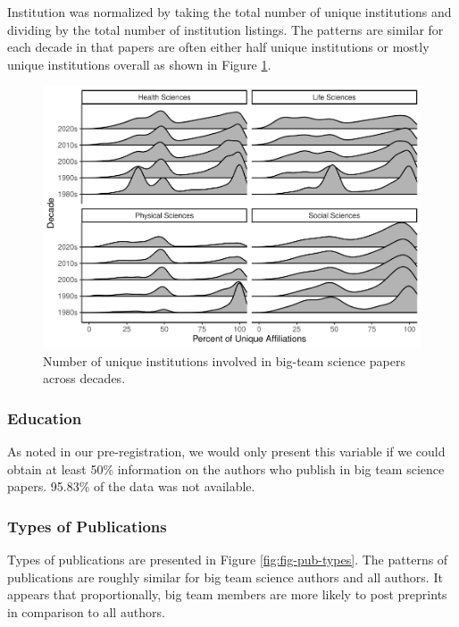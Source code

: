 \documentclass[
  man,mask,floatsintext]{apa7}
\begin{document}
Institution was normalized by taking the total number of unique institutions and dividing by the total number of institution listings. The patterns are similar for each decade in that papers are often either half unique institutions or mostly unique institutions overall as shown in Figure \ref{fig:fig-inst}.

\begin{figure}
\centering
\includegraphics{manuscript_scopus_files/figure-latex/fig-inst-1.pdf}
\caption{\label{fig:fig-inst}Number of unique institutions involved in big-team science papers across decades.}
\end{figure}

\hypertarget{education-1}{%
\subsubsection{Education}\label{education-1}}

As noted in our pre-registration, we would only present this variable if we could obtain at least 50\% information on the authors who publish in big team science papers. 95.83\% of the data was not available.

\hypertarget{types-of-publications-1}{%
\subsubsection{Types of Publications}\label{types-of-publications-1}}

Types of publications are presented in Figure \ref{fig:fig-pub-types}. The patterns of publications are roughly similar for big team science authors and all authors. It appears that proportionally, big team members are more likely to post preprints in comparison to all authors.
\end{document}
